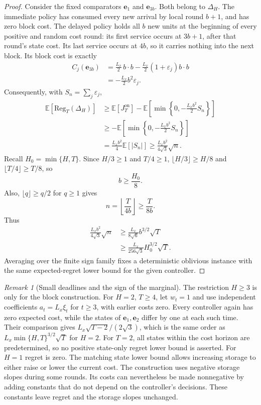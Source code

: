 \documentclass[11pt]{article}
\newcommand{\E}{\mathbb{E}}
\newcommand{\Reg}{\mathrm{Reg}}
\theoremstyle{plain}
\theoremstyle{remark}
\newtheorem{Thm:Remark}[Thm:Theorem]{Remark}
\numberwithin{equation}{section}
\begin{document}
\begin{proof}
Consider the fixed comparators $\mathbf e_1$ and $\mathbf e_{3b}$. Both belong to $\Delta_H$.
The immediate policy has consumed every new arrival by local round $b+1$,
and has zero block cost. The delayed policy holds all $b$ new units at the
beginning of every positive and random cost round: its first service occurs
at $3b+1$, after that round's state cost. Its last service occurs at $4b$,
so it carries nothing into the next block. Its block cost is exactly
\begin{align}
C_j(\mathbf e_{3b})
&=\frac{L_x}{2}\,b\cdot b
-\frac{L_x}{2}(1+\varepsilon_j)b\cdot b\nonumber\\
&=-\frac{L_x}{2}b^2\varepsilon_j.
\label{ch6:eq:block-comparator}
\end{align}
Consequently, with $S_n=\sum_j\varepsilon_j$,
\begin{align}
 \E[\Reg_T(\Delta_H)]
 &\ge \E[J_T^{\mathrm{on}}]
 -\E\left[\min\!\left\{0,-\frac{L_xb^2}{2}S_n\right\}\right]\nonumber\\
 &\ge-\E\left[\min\!\left\{0,-\frac{L_xb^2}{2}S_n\right\}\right]\nonumber\\
 &=\frac{L_xb^2}{4}\E[|S_n|]
 \ge\frac{L_xb^2}{4\sqrt3}\sqrt n.
 \label{ch6:eq:block-lower}
\end{align}
Recall $H_0=\min\{H,T\}$. Since $H/3\ge1$ and $T/4\ge1$,
$\lfloor H/3\rfloor\ge H/8$ and
$\lfloor T/4\rfloor\ge T/8$, so
\[
b\ge\frac{H_0}{8}.
\]
Also, $\lfloor q\rfloor\ge q/2$ for $q\ge1$ gives
\[
n=\left\lfloor\frac{T}{4b}\right\rfloor
\ge\frac{T}{8b}.
\]
Thus
\begin{align*}
\frac{L_xb^2}{4\sqrt3}\sqrt n
&\ge\frac{L_x}{8\sqrt6}b^{3/2}\sqrt T\\
&\ge\frac{L_x}{256\sqrt3}H_0^{3/2}\sqrt T.
\end{align*}
Averaging over the finite sign family fixes a deterministic oblivious
instance with the same expected-regret lower bound for the given controller.
\end{proof}

\begin{Thm:Remark}[Small deadlines and the sign of the marginal]
The restriction $H\ge3$ is only for the block construction.
For $H=2$, $T\ge4$, let $w_t=1$ and use independent coefficients
$a_t=L_x\xi_t$ for $t\ge3$, with earlier costs zero.
Every controller again has zero expected cost, while the states of
$\mathbf e_1,\mathbf e_2$ differ by one at each such time. Their comparison gives
$L_x\sqrt{T-2}/(2\sqrt3)$, which is the same order as
$L_x\min\{H,T\}^{3/2}\sqrt T$ for $H=2$.
For $T=2$, all states within the cost horizon are predetermined, so no positive
state-only regret lower bound is asserted. For $H=1$ regret is zero.
The matching state lower bound allows increasing storage to either raise
or lower the current cost. The construction uses negative storage slopes
during some rounds. Its costs can nevertheless be made nonnegative by
adding constants that do not depend on the controller's decisions.
These constants leave regret and the storage slopes unchanged.
\end{Thm:Remark}
\end{document}
